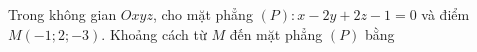 \begin{ex}
Trong không gian $Oxyz$, cho mặt phẳng $(P)\colon x-2y+2z-1=0$ và điểm $M(-1;2;-3)$. Khoảng cách từ $M$ đến mặt phẳng $(P)$ bằng
\end{ex}
